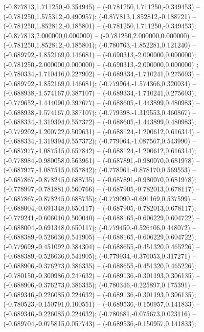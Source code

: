  (-0.877813,1.711250,-0.354945) -- (-0.781250,1.711250,-0.349453) -- (-0.781250,1.575312,-0.490957);
 (-0.877813,1.852812,-0.188721) -- (-0.781250,1.852812,-0.185801) -- (-0.781250,1.711250,-0.349453);
 (-0.877813,2.000000,0.000000) -- (-0.781250,2.000000,0.000000) -- (-0.781250,1.852812,-0.185801);
 (-0.780763,-1.852281,0.121240) -- (-0.689792,-1.852169,0.146681) -- (-0.690313,-2.000000,0.000000);
 (-0.781250,-2.000000,0.000000) -- (-0.690313,-2.000000,0.000000) ;
 (-0.780334,-1.710416,0.227902) -- (-0.689334,-1.710241,0.275693) -- (-0.689792,-1.852169,0.146681);
 (-0.779964,-1.574366,0.320034) -- (-0.688938,-1.574167,0.387107) -- (-0.689334,-1.710241,0.275693);
 (-0.779652,-1.444090,0.397677) -- (-0.688605,-1.443899,0.480983) -- (-0.688938,-1.574167,0.387107);
 (-0.779398,-1.319553,0.460867) -- (-0.688334,-1.319394,0.557372) -- (-0.688605,-1.443899,0.480983);
 (-0.779202,-1.200722,0.509631) -- (-0.688124,-1.200612,0.616314) -- (-0.688334,-1.319394,0.557372);
 (-0.779064,-1.087567,0.543990) -- (-0.687977,-1.087515,0.657842) -- (-0.688124,-1.200612,0.616314);
 (-0.778984,-0.980058,0.563961) -- (-0.687891,-0.980070,0.681978) -- (-0.687977,-1.087515,0.657842);
 (-0.778961,-0.878170,0.569553) -- (-0.687867,-0.878245,0.688735) -- (-0.687891,-0.980070,0.681978);
 (-0.778997,-0.781881,0.560766) -- (-0.687905,-0.782013,0.678117) -- (-0.687867,-0.878245,0.688735);
 (-0.779090,-0.691169,0.537599) -- (-0.688004,-0.691348,0.650117) -- (-0.687905,-0.782013,0.678117);
 (-0.779241,-0.606016,0.500040) -- (-0.688165,-0.606229,0.604722) -- (-0.688004,-0.691348,0.650117);
 (-0.779450,-0.526406,0.448072) -- (-0.688389,-0.526636,0.541905) -- (-0.688165,-0.606229,0.604722);
 (-0.779699,-0.451092,0.384304) -- (-0.688655,-0.451320,0.465226) -- (-0.688389,-0.526636,0.541905);
 (-0.779934,-0.376053,0.317271) -- (-0.688906,-0.376273,0.386335) -- (-0.688655,-0.451320,0.465226);
 (-0.780150,-0.300986,0.247632) -- (-0.689136,-0.301193,0.306135) -- (-0.688906,-0.376273,0.386335);
 (-0.780346,-0.225897,0.175391) -- (-0.689346,-0.226085,0.224632) -- (-0.689136,-0.301193,0.306135);
 (-0.780523,-0.150791,0.100551) -- (-0.689536,-0.150957,0.141833) -- (-0.689346,-0.226085,0.224632);
 (-0.780681,-0.075673,0.023116) -- (-0.689704,-0.075815,0.057743) -- (-0.689536,-0.150957,0.141833);

